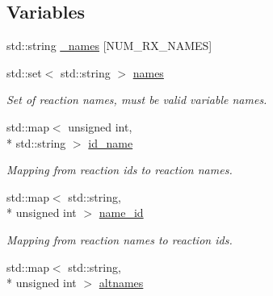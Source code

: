 \subsection*{Variables}
\begin{DoxyCompactItemize}
\item 
std\-::string \hyperlink{namespacepyne_1_1rxname_a880e1a059fe54b6fd425cc3319978555}{\-\_\-names} \mbox{[}N\-U\-M\-\_\-\-R\-X\-\_\-\-N\-A\-M\-E\-S\mbox{]}
\item 
\hypertarget{namespacepyne_1_1rxname_a28dfc07e16c270b89549889be5d3146d}{std\-::set$<$ std\-::string $>$ \hyperlink{namespacepyne_1_1rxname_a28dfc07e16c270b89549889be5d3146d}{names}}\label{namespacepyne_1_1rxname_a28dfc07e16c270b89549889be5d3146d}

\begin{DoxyCompactList}\small\item\em Set of reaction names, must be valid variable names. \end{DoxyCompactList}\item 
\hypertarget{namespacepyne_1_1rxname_a28e72f5e8a19c035368e0eb72b2947d5}{std\-::map$<$ unsigned int, \\*
std\-::string $>$ \hyperlink{namespacepyne_1_1rxname_a28e72f5e8a19c035368e0eb72b2947d5}{id\-\_\-name}}\label{namespacepyne_1_1rxname_a28e72f5e8a19c035368e0eb72b2947d5}

\begin{DoxyCompactList}\small\item\em Mapping from reaction ids to reaction names. \end{DoxyCompactList}\item 
\hypertarget{namespacepyne_1_1rxname_a615522d66adc558775f60c559b3127fe}{std\-::map$<$ std\-::string, \\*
unsigned int $>$ \hyperlink{namespacepyne_1_1rxname_a615522d66adc558775f60c559b3127fe}{name\-\_\-id}}\label{namespacepyne_1_1rxname_a615522d66adc558775f60c559b3127fe}

\begin{DoxyCompactList}\small\item\em Mapping from reaction names to reaction ids. \end{DoxyCompactList}\item 
\hypertarget{namespacepyne_1_1rxname_a7109ca2a2a6aea74d372262172e3a203}{std\-::map$<$ std\-::string, \\*
unsigned int $>$ \hyperlink{namespacepyne_1_1rxname_a7109ca2a2a6aea74d372262172e3a203}{altnames}}\label{namespacepyne_1_1rxname_a7109ca2a2a6aea74d372262172e3a203}


\end{DoxyCompactItemize}
